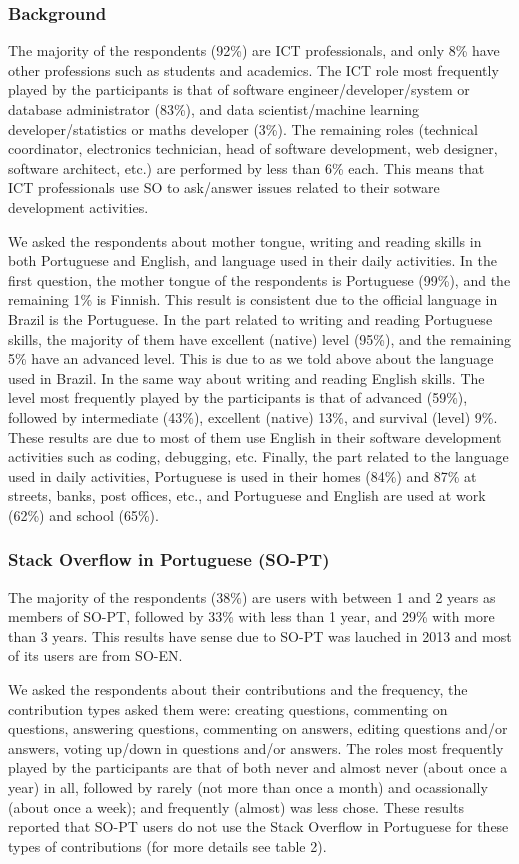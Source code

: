 \subsubsection{Background}
The majority of the respondents (92\%) are ICT professionals, and only 8\% have other professions such as students and academics. The ICT role most frequently played by the participants is that of software engineer/developer/system or database administrator (83\%), and data scientist/machine learning developer/statistics or maths developer (3\%). The remaining roles (technical coordinator, electronics technician, head of software development, web designer, software architect, etc.) are performed by less than 6\% each. This means that ICT professionals use SO to ask/answer issues related to their sotware development activities.

We asked the respondents about mother tongue, writing and reading skills in both Portuguese and English, and language used in their daily activities. In the first question, the mother tongue of the respondents is Portuguese (99\%), and the remaining 1\% is Finnish. This result is consistent due to the official language in Brazil is the Portuguese. In the part related to writing and reading Portuguese skills, the majority of them have excellent (native) level (95\%), and the remaining 5\% have an advanced level. This is due to as we told above about the language used in Brazil. In the same way about writing and reading English skills. The level most frequently played by the participants is that of advanced (59\%), followed by intermediate (43\%), excellent (native) 13\%, and survival (level) 9\%. These results are due to most of them use English in their software development activities such as coding, debugging, etc. Finally, the part related to the language used in daily activities, Portuguese is used in their homes (84\%) and 87\% at streets, banks, post offices, etc., and Portuguese and English are used at work (62\%) and school (65\%). 

\subsubsection{Stack Overflow in Portuguese (SO-PT)}
The majority of the respondents (38\%) are users with between 1 and 2 years as members of SO-PT, followed by 33\% with less than 1 year, and 29\% with more than 3 years. This results have sense due to SO-PT was lauched in 2013 and most of its users are from SO-EN.
  
We asked the respondents about their contributions and the frequency, the contribution types asked them were: creating questions, commenting on questions, answering questions, commenting on answers, editing questions and/or answers, voting up/down in questions and/or answers. The roles most frequently played by the participants are that of both never and almost never (about once a year) in all, followed by rarely (not more than once a month) and ocassionally (about once a week); and frequently (almost) was less chose. These results reported that SO-PT users do not use the Stack Overflow in Portuguese for these types of contributions (for more details see table 2). 


